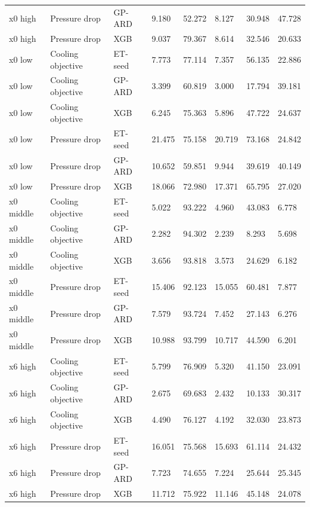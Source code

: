 \begin{longtable}{llllllll}
x0 high & Pressure drop & GP-ARD & 9.180 & 52.272 & 8.127 & 30.948 & 47.728\\
x0 high & Pressure drop & XGB & 9.037 & 79.367 & 8.614 & 32.546 & 20.633\\
x0 low & Cooling objective & ET-seed & 7.773 & 77.114 & 7.357 & 56.135 & 22.886\\
x0 low & Cooling objective & GP-ARD & 3.399 & 60.819 & 3.000 & 17.794 & 39.181\\
x0 low & Cooling objective & XGB & 6.245 & 75.363 & 5.896 & 47.722 & 24.637\\
x0 low & Pressure drop & ET-seed & 21.475 & 75.158 & 20.719 & 73.168 & 24.842\\
x0 low & Pressure drop & GP-ARD & 10.652 & 59.851 & 9.944 & 39.619 & 40.149\\
x0 low & Pressure drop & XGB & 18.066 & 72.980 & 17.371 & 65.795 & 27.020\\
x0 middle & Cooling objective & ET-seed & 5.022 & 93.222 & 4.960 & 43.083 & 6.778\\
x0 middle & Cooling objective & GP-ARD & 2.282 & 94.302 & 2.239 & 8.293 & 5.698\\
x0 middle & Cooling objective & XGB & 3.656 & 93.818 & 3.573 & 24.629 & 6.182\\
x0 middle & Pressure drop & ET-seed & 15.406 & 92.123 & 15.055 & 60.481 & 7.877\\
x0 middle & Pressure drop & GP-ARD & 7.579 & 93.724 & 7.452 & 27.143 & 6.276\\
x0 middle & Pressure drop & XGB & 10.988 & 93.799 & 10.717 & 44.590 & 6.201\\
x6 high & Cooling objective & ET-seed & 5.799 & 76.909 & 5.320 & 41.150 & 23.091\\
x6 high & Cooling objective & GP-ARD & 2.675 & 69.683 & 2.432 & 10.133 & 30.317\\
x6 high & Cooling objective & XGB & 4.490 & 76.127 & 4.192 & 32.030 & 23.873\\
x6 high & Pressure drop & ET-seed & 16.051 & 75.568 & 15.693 & 61.114 & 24.432\\
x6 high & Pressure drop & GP-ARD & 7.723 & 74.655 & 7.224 & 25.644 & 25.345\\
x6 high & Pressure drop & XGB & 11.712 & 75.922 & 11.146 & 45.148 & 24.078\\
\bottomrule\end{longtable}\endgroup
